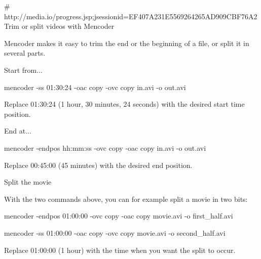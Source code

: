 # http://media.io/progress.jsp;jsessionid=EF407A231E5569264265AD909CBF76A2
Trim or split videos with Mencoder

Mencoder makes it easy to trim the end or the beginning of a file, or split it in several parts.

Start from...

mencoder -ss 01:30:24 -oac copy -ovc copy in.avi -o out.avi

Replace 01:30:24 (1 hour, 30 minutes, 24 seconds) with the desired start time position.

End at...

mencoder -endpos hh:mm:ss -ovc copy -oac copy in.avi -o out.avi

Replace 00:45:00 (45 minutes) with the desired end position.

Split the movie

With the two commands above, you can for example split a movie in two bits:

mencoder -endpos 01:00:00 -ovc copy -oac copy movie.avi -o first_half.avi

mencoder -ss 01:00:00 -oac copy -ovc copy movie.avi -o second_half.avi

Replace 01:00:00 (1 hour) with the time when you want the split to occur. 
